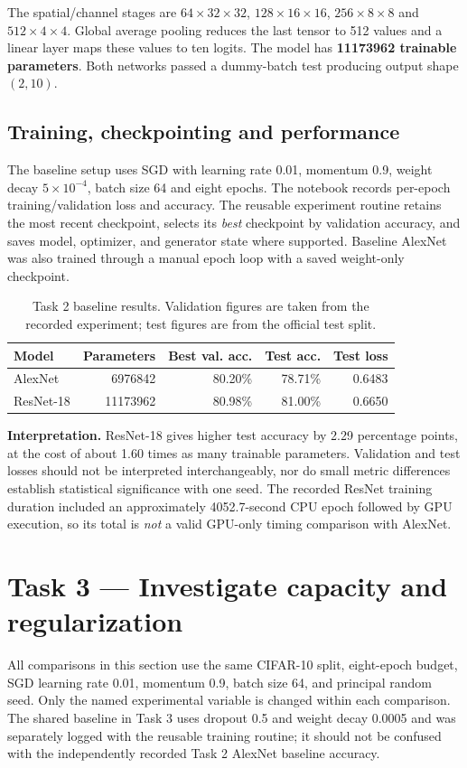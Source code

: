 \documentclass[11pt,a4paper]{article}
\begin{document}
The spatial/channel stages are $64\times32\times32$, $128\times16\times16$, $256\times8\times8$ and $512\times4\times4$. Global average pooling reduces the last tensor to 512 values and a linear layer maps these values to ten logits. The model has \textbf{\num{11173962} trainable parameters}. Both networks passed a dummy-batch test producing output shape $(2,10)$.

\subsection{Training, checkpointing and performance}
The baseline setup uses SGD with learning rate 0.01, momentum 0.9, weight decay $5\times10^{-4}$, batch size 64 and eight epochs. The notebook records per-epoch training/validation loss and accuracy. The reusable experiment routine retains the most recent checkpoint, selects its \emph{best} checkpoint by validation accuracy, and saves model, optimizer, and generator state where supported. Baseline AlexNet was also trained through a manual epoch loop with a saved weight-only checkpoint.

\begin{table}[htbp]\centering
\caption{Task 2 baseline results. Validation figures are taken from the recorded experiment; test figures are from the official test split.}
\begin{tabular}{lrrrr}\toprule
Model & Parameters & Best val. acc. & Test acc. & Test loss\\\midrule
AlexNet & \num{6976842} & 80.20\% & 78.71\% & 0.6483\\
ResNet-18 & \num{11173962} & 80.98\% & 81.00\% & 0.6650\\\bottomrule
\end{tabular}\end{table}

\textbf{Interpretation.} ResNet-18 gives higher test accuracy by 2.29 percentage points, at the cost of about 1.60 times as many trainable parameters. Validation and test losses should not be interpreted interchangeably, nor do small metric differences establish statistical significance with one seed. The recorded ResNet training duration included an approximately \num{4052.7}-second CPU epoch followed by GPU execution, so its total is \emph{not} a valid GPU-only timing comparison with AlexNet.

\section{Task 3 --- Investigate capacity and regularization}
All comparisons in this section use the same CIFAR-10 split, eight-epoch budget, SGD learning rate 0.01, momentum 0.9, batch size 64, and principal random seed. Only the named experimental variable is changed within each comparison. The shared baseline in Task 3 uses dropout 0.5 and weight decay 0.0005 and was separately logged with the reusable training routine; it should not be confused with the independently recorded Task 2 AlexNet baseline accuracy.
\end{document}
